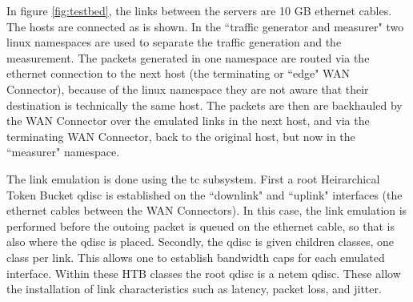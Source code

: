 In figure \ref{fig:testbed}, the links between the servers are 10 GB ethernet cables. The hosts are connected as is shown. In the “traffic generator and measurer" two linux namespaces are used to separate the traffic generation and the measurement. The packets generated in one namespace are routed via the ethernet connection to the next host (the terminating or “edge" WAN Connector), because of the linux namespace they are not aware that their destination is technically the same host. The packets are then are backhauled by the WAN Connector over the emulated links in the next host, and via the terminating WAN Connector, back to the original host, but now in the “measurer" namespace.

The link emulation is done using the tc subsystem. First a root Heirarchical Token Bucket qdisc is established on the “downlink" and “uplink" interfaces (the ethernet cables between the WAN Connectors). In this case, the link emulation is performed before the outoing packet is queued on the ethernet cable, so that is also where the qdisc is placed. Secondly, the qdisc is given children classes, one class per link. This allows one to establish bandwidth caps for each emulated interface. Within these HTB classes the root qdisc is a netem qdisc. These allow the installation of link characteristics such as latency, packet loss, and jitter.



